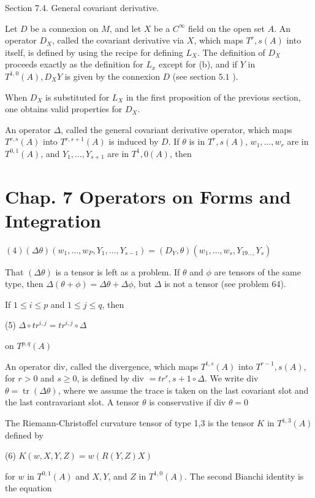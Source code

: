 \documentclass[10pt]{article}
\begin{document}
Section 7.4. General covariant derivative.

Let $D$ be a connexion on $M$, and let $X$ be a $C^{\infty}$ field on the open set $A$. An operator $D_{X}$, called the covariant derivative via $X$, which maps $T^{r}, s(A)$ into itself, is defined by using the recipe for defining $L_{X}$. The definition of $D_{X}$ proceeds exactly as the definition for $L_{x}$ except for (b), and if $Y$ in $T^{1,0}(A), D_{X} Y$ is given by the connexion $D$ (see section $5.1$ ).

When $D_{X}$ is substituted for $L_{X}$ in the first proposition of the previous section, one obtains valid properties for $D_{X}$.

An operator $\Delta$, called the general covariant derivative operator, which maps $T^{r, s}(A)$ into $T^{r, s+1}(A)$ is induced by $D$. If $\theta$ is in $T^{r}, s(A)$, $w_{1}, \ldots, w_{r}$ are in $T^{0,1}(A)$, and $Y_{1}, \ldots, Y_{s+1}$ are in $T^{1}, 0(A)$, then

\section{Chap. 7 Operators on Forms and Integration}
$(4)(\Delta \theta)\left(w_{1}, \ldots, w_{P}, Y_{1}, \ldots, Y_{s-1}\right)=\left(D_{Y}, \theta\right)\left(w_{1}, \ldots, w_{s}, Y_{19 \ldots,} Y_{s}\right)$

That $(\Delta \theta)$ is a tensor is left as a problem. If $\theta$ and $\phi$ are tensors of the same type, then $\Delta(\theta+\phi)=\Delta \theta+\Delta \phi$, but $\Delta$ is not a tensor (see problem 64).

If $1 \leq i \leq p$ and $1 \leq j \leq q$, then

(5) $\Delta \circ t r^{i, j}=t r^{i, j} \circ \Delta$

on $T^{p, q}(A)$

An operator div, called the divergence, which maps $T^{t, s}(A)$ into $T^{r-1}, s(A)$, for $r>0$ and $s \geq 0$, is defined by div $=t r^{r}, s+1 \circ \Delta$. We write div $\theta=\operatorname{tr}(\Delta \theta)$, where we assume the trace is taken on the last covariant slot and the last contravariant slot. A tensor $\theta$ is conservative if div $\theta=0$

The Riemann-Christoffel curvature tensor of type 1,3 is the tensor $K$ in $T^{1,3}(A)$ defined by

(6) $K(w, X, Y, Z)=w(R(Y, Z) X)$

for $w$ in $T^{0,1}(A)$ and $X, Y$, and $Z$ in $T^{1,0}(A)$. The second Bianchi identity is the equation
\end{document}
